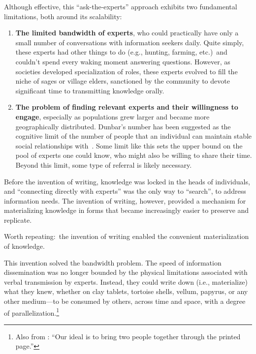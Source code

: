 \documentclass{article}
\begin{document}
Although effective, this ``ask-the-experts'' approach exhibits two fundamental limitations, both around its scalability:

\begin{enumerate}

\item {\bf The limited bandwidth of experts}, who could practically have only a small number of conversations with information seekers daily.
Quite simply, these experts had other things to do (e.g., hunting, farming, etc.)\ and couldn't spend every waking moment answering questions.
However, as societies developed specialization of roles, these experts evolved to fill the niche of sages or village elders, sanctioned by the community to devote significant time to transmitting knowledge orally.

\item {\bf The problem of finding relevant experts and their willingness to engage}, especially as populations grew larger and became more geographically distributed.
Dunbar's number has been suggested as the cognitive limit of the number of people that an individual can maintain stable social relationships with~\citep{Dunbar92}.
Some limit like this sets the upper bound on the pool of experts one could know, who might also be willing to share their time.
Beyond this limit, some type of referral is likely necessary.

\end{enumerate}

Before the invention of writing, knowledge was locked in the heads of individuals, and ``connecting directly with experts'' was the only way to ``search'', to address information needs.
The invention of writing, however, provided a mechanism for materializing knowledge in forms that became increasingly easier to preserve and replicate.

Worth repeating:\ the invention of writing enabled the convenient materialization of knowledge.

This invention solved the bandwidth problem.
The speed of information dissemination was no longer bounded by the physical limitations associated with verbal transmission by experts.
Instead, they could write down (i.e., materialize) what they knew, whether on clay tablets, tortoise shells, vellum, papyrus, or any other medium---to be consumed by others, across time and space, with a degree of parallelization.\footnote{Also from \cite{Taylor62}: ``Our ideal is to bring two people together through the printed page.''}
\end{document}
